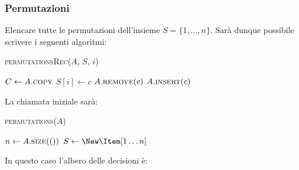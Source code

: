        \subsubsection{Permutazioni}
            Elencare tutte le permutazioni dell'insieme $S = \{1,\dots, n\}$.\newline
            Sarà dunque possibile scrivere i seguenti algoritmi:
            \begin{algorithm}[H]
                \caption{\textsc{permutationsRec}(\Set $A$, \Item[] $S$, \Int $i$)}
                \begin{algorithmic}
                     
                        \State {}
                    \Else {}
                        \Set $C \gets A.\Call{copy}{}$
                            \State $S[i] \gets c$
                            \State $A.\Call{remove}{c}$
                            \State {}
                            \State $A.\Call{insert}{c}$
                        \EndFor
                    \EndIf
                \end{algorithmic}
            \end{algorithm}
            La chiamata iniziale sarà:
            \begin{algorithm}[H]
                \caption{\textsc{permutations}(\Set $A$)}
                \begin{algorithmic}
                    \State \Int $n \gets A.\Call{size}()$
                    \State \Item[] $S \gets \New \Item[1\dots n]$
                    \State {}
                \end{algorithmic}
            \end{algorithm}
            In questo caso l'albero delle decisioni è:
